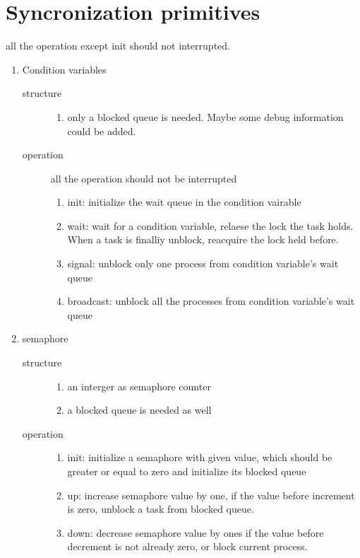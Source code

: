 \documentclass{article}
\begin{document}
\section{Syncronization primitives}
all the operation except init should not interrupted.
\begin{enumerate}
\item Condition variables
  \begin{description}
  \item[structure] 
    \begin{enumerate}
    \item only a blocked queue is needed. Maybe some debug information could be added.
    \end{enumerate}
  \item[operation]
    all the operation should not be interrupted
    \begin{enumerate}
    \item init: initialize the wait queue in the condition vairable
    \item wait: wait for a condition variable, relaese the lock the task holds. When a task is finalliy unblock, reacquire the lock held before.
    \item signal: unblock only one process from condition variable's wait queue
    \item broadcast: unblock all the processes from condition variable's wait queue
    \end{enumerate}
  \end{description}
\item semaphore
  \begin{description}
  \item [structure]
    \begin{enumerate}
    \item an interger as semaphore counter
    \item a blocked queue is needed as well
    \end{enumerate}
  \item[operation]
    \begin{enumerate}
    \item init: initialize a semaphore with given value, which should be greater or equal to zero and initialize its blocked queue
    \item up: increase semaphore value by one, if the value before increment is zero, unblock a task from blocked queue.
    \item down: decrease semaphore value by ones if the value before decrement is not already zero, or block current process.

\end{enumerate}
\end{description}
\end{enumerate}
\end{document}
